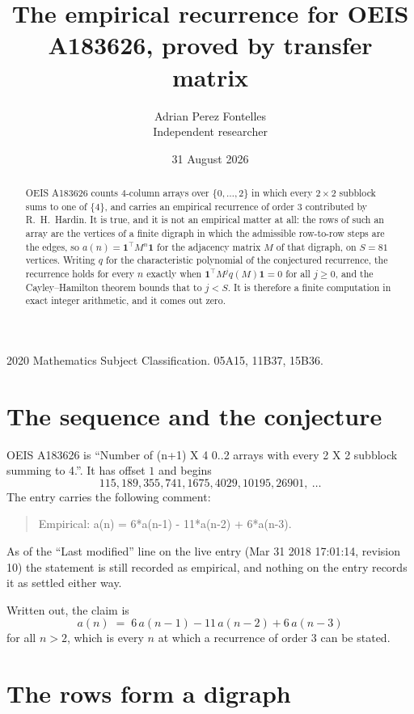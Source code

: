 \documentclass[11pt,a4paper]{article}
\title{The empirical recurrence for OEIS A183626, proved by transfer matrix}
\author{Adrian Perez Fontelles\\ \small Independent researcher}
\date{31 August 2026}
\theoremstyle{plain}
\theoremstyle{definition}
\begin{document}
\maketitle

\begin{abstract}
OEIS A183626 counts $4$-column arrays over $\{0,\dots,2\}$ in which every
$2\times2$ subblock sums to one of $\{4\}$, and carries an empirical
recurrence of order $3$ contributed by R.~H.~Hardin. It is true, and it is not an
empirical matter at all: the rows of such an array are the vertices of a finite digraph in
which the admissible row-to-row steps are the edges, so $a(n)=\mathbf{1}^{\!\top}M^{n}
\mathbf{1}$ for the adjacency matrix $M$ of that digraph, on $S=81$ vertices. Writing
$q$ for the characteristic polynomial of the conjectured recurrence, the recurrence holds
for every $n$ exactly when $\mathbf{1}^{\!\top}M^{j}q(M)\mathbf{1}=0$ for all
$j\ge0$, and the Cayley--Hamilton theorem bounds that to $j<S$. It is therefore a finite
computation in exact integer arithmetic, and it comes out zero.
\end{abstract}

\noindent\small 2020 Mathematics Subject Classification. 05A15, 11B37, 15B36.\normalsize

\section{The sequence and the conjecture}

OEIS A183626 is ``Number of (n+1) X 4 0..2 arrays with every 2 X 2 subblock summing to 4.''. It has offset $1$
and begins
\[
115, 189, 355, 741, 1675, 4029, 10195, 26901,\ \dots
\]
The entry carries the following comment:
\begin{quote}\small
Empirical: a(n) = 6*a(n-1) - 11*a(n-2) + 6*a(n-3).
\end{quote}
As of the ``Last modified'' line on the live entry (Mar 31 2018 17:01:14, revision 10) the statement is
still recorded as empirical, and nothing on the entry records it as settled either way.

Written out, the claim is
\begin{equation}\label{eq:conj}
a(n)\;=\;6\,a(n-1) - 11\,a(n-2) + 6\,a(n-3)
\end{equation}
for all $n>2$, which is every $n$ at which a recurrence of order $3$ can be
stated.

\section{The rows form a digraph}
\end{document}
